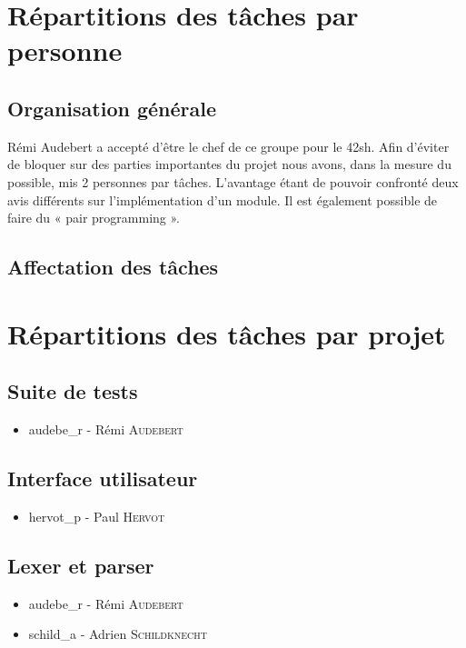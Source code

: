 \section{Répartitions des tâches par personne}

\subsection{Organisation générale}
Rémi Audebert a accepté d'être le chef de ce groupe pour le 42sh.
Afin d'éviter de bloquer sur des parties importantes du projet nous avons,
dans la mesure du possible, mis 2 personnes par tâches. L'avantage étant
de pouvoir confronté deux avis différents sur l'implémentation d'un module.
Il est également possible de faire du « pair programming ».

\subsection{Affectation des tâches}






\section{Répartitions des tâches par projet}

\subsection{Suite de tests}

\begin{itemize}
    \item audebe\_r - Rémi \textsc{Audebert}
\end{itemize}

\subsection{Interface utilisateur}

\begin{itemize}
    \item hervot\_p - Paul \textsc{Hervot}
\end{itemize}

\subsection{Lexer et parser}

\begin{itemize}
    \item audebe\_r - Rémi \textsc{Audebert}
    \item schild\_a - Adrien \textsc{Schildknecht}
\end{itemize}

